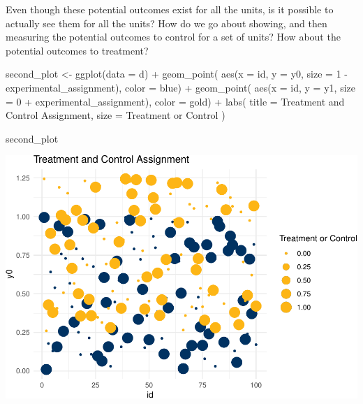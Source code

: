 \documentclass[
]{article}
\newenvironment{Shaded}{\begin{snugshade}}{\end{snugshade}}
\newcommand{\AttributeTok}[1]{\textcolor[rgb]{0.77,0.63,0.00}{#1}}
\newcommand{\DecValTok}[1]{\textcolor[rgb]{0.00,0.00,0.81}{#1}}
\newcommand{\FunctionTok}[1]{\textcolor[rgb]{0.00,0.00,0.00}{#1}}
\newcommand{\NormalTok}[1]{#1}
\newcommand{\OtherTok}[1]{\textcolor[rgb]{0.56,0.35,0.01}{#1}}
\newcommand{\SpecialCharTok}[1]{\textcolor[rgb]{0.00,0.00,0.00}{#1}}
\newcommand{\StringTok}[1]{\textcolor[rgb]{0.31,0.60,0.02}{#1}}
\begin{document}
Even though these potential outcomes exist for all the units, is it possible to actually see them for all the units? How do we go about showing, and then measuring the potential outcomes to control for a set of units? How about the potential outcomes to treatment?

\begin{Shaded}
\begin{Highlighting}[]
\NormalTok{second\_plot }\OtherTok{\textless{}{-}} \FunctionTok{ggplot}\NormalTok{(}\AttributeTok{data =}\NormalTok{ d) }\SpecialCharTok{+} 
  \FunctionTok{geom\_point}\NormalTok{(}
    \FunctionTok{aes}\NormalTok{(}\AttributeTok{x =}\NormalTok{ id, }\AttributeTok{y =}\NormalTok{ y0, }\AttributeTok{size =} \DecValTok{1} \SpecialCharTok{{-}}\NormalTok{ experimental\_assignment), }
    \AttributeTok{color =}\NormalTok{ blue) }\SpecialCharTok{+} 
  \FunctionTok{geom\_point}\NormalTok{(}
    \FunctionTok{aes}\NormalTok{(}\AttributeTok{x =}\NormalTok{ id, }\AttributeTok{y =}\NormalTok{ y1, }\AttributeTok{size =} \DecValTok{0} \SpecialCharTok{+}\NormalTok{ experimental\_assignment), }
    \AttributeTok{color =}\NormalTok{ gold) }\SpecialCharTok{+} 
  \FunctionTok{labs}\NormalTok{(}
    \AttributeTok{title =} \StringTok{\textquotesingle{}Treatment and Control Assignment\textquotesingle{}}\NormalTok{, }
    \AttributeTok{size =} \StringTok{\textquotesingle{}Treatment or Control\textquotesingle{}}
\NormalTok{  )}

\NormalTok{second\_plot}
\end{Highlighting}
\end{Shaded}

\includegraphics{241-live-session_files/figure-latex/add points to plot-1.pdf}
\end{document}
